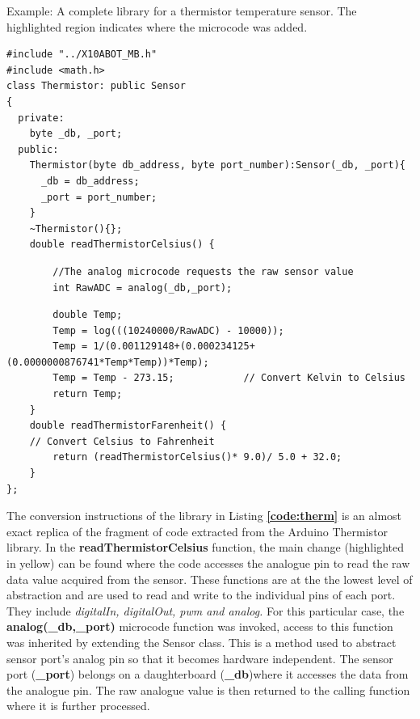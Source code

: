 \begin{listing}
		\footnotesize
        {\fontsize{8}{6}\selectfont
		\caption{Example: A complete library for a thermistor temperature sensor. The highlighted region indicates where the \xten microcode was added.} \label{code:therm}
		\begin{verbatim}
#include "../X10ABOT_MB.h"
#include <math.h>
class Thermistor: public Sensor
{
  private:
    byte _db, _port;
  public:
    Thermistor(byte db_address, byte port_number):Sensor(_db, _port){
      _db = db_address;
      _port = port_number;
    }
    ~Thermistor(){};
    double readThermistorCelsius() {
    \end{verbatim}
    \begin{verbatim}
        //The analog microcode requests the raw sensor value
        int RawADC = analog(_db,_port); 
    \end{verbatim}
    \begin{verbatim}
        double Temp;
        Temp = log(((10240000/RawADC) - 10000));
        Temp = 1/(0.001129148+(0.000234125+(0.0000000876741*Temp*Temp))*Temp);
        Temp = Temp - 273.15;            // Convert Kelvin to Celsius
        return Temp;
    }
    double readThermistorFarenheit() {
    // Convert Celsius to Fahrenheit
        return (readThermistorCelsius()* 9.0)/ 5.0 + 32.0;
    }
};
	\end{verbatim}
		}
\end{listing}

The conversion instructions of the \xten library in Listing \textbf{\ref{code:therm} }is an almost exact replica of the fragment of code extracted from the Arduino Thermistor library. In the \textbf{readThermistorCelsius} function, the main change (highlighted in yellow) can be found where the code accesses the analogue pin to read the raw data value acquired from the sensor. These functions are at the the lowest level of abstraction and are used to read and write to the individual pins of each port. They include \emph{digitalIn, digitalOut, pwm and analog.} For this particular case, the \textbf{analog(\_db,\_port)} microcode function was invoked, access to this function was inherited by extending the Sensor class. This is a method used to abstract sensor port's analog pin so that it becomes hardware independent. The sensor port (\textbf{\_port}) belongs on a daughterboard (\textbf{\_db})where it accesses the data from the  analogue pin. The raw analogue value is then returned to the calling function where it is further processed.

